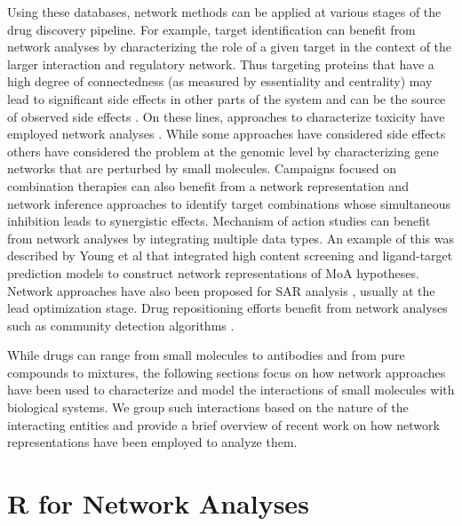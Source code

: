 \documentclass[]{book}
\begin{document}
Using these databases, network methods can be applied at various
stages of the drug discovery pipeline. For example, target
identification can benefit from network analyses by characterizing the
role of a given target in the context of the larger interaction and
regulatory network. Thus targeting proteins that have a high degree of
connectedness (as measured by essentiality and centrality) may lead to
significant side effects in other parts of the system and can be the
source of observed side effects \cite{Wang:2013gn}. On these lines,
approaches to characterize toxicity have employed network analyses
\cite{Kim:2014xs,Zhang:2014hj}. While some approaches have considered
side effects \cite{Lounkine:2012yf} others have considered the problem
at the genomic level by characterizing gene networks that are
perturbed by small molecules. Campaigns focused on combination
therapies can also benefit from a network representation and network
inference approaches \cite{Huang:2014by,Tang:2013lr} to identify
target combinations whose simultaneous inhibition leads to synergistic
effects. Mechanism of action studies can benefit from network analyses
by integrating multiple data types. An example of this was described
by Young et al \cite{Young:2008aa} that integrated high content
screening and ligand-target prediction models to construct network
representations of MoA hypotheses. Network approaches have also been
proposed for SAR analysis \cite{Iyer:2011ij,Wawer:2008aa}, usually at
the lead optimization stage. Drug repositioning efforts
\cite{Dudley:2011dn,Gottlieb:2011rx} benefit from network analyses
such as community detection algorithms \cite{girvan2002community}.

While drugs can range from small molecules to antibodies and from pure
compounds to mixtures, the following sections focus on how network
approaches have been used to characterize and model the interactions
of small molecules with biological systems. We group such interactions
based on the nature of the interacting entities and provide a brief
overview of recent work on how network representations have been
employed to analyze them. 

\section{R for Network Analyses}
\label{sec:r-network-analyses}
\end{document}
